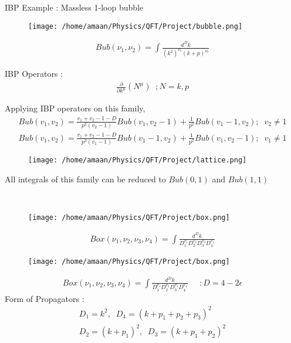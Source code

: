 \documentclass[11pt]{beamer}
\begin{document}
\begin{frame}{IBP Example : Massless 1-loop bubble}
		\begin{figure}
		\centering
		\texttt{[image: /home/amaan/Physics/QFT/Project/bubble.png]}
	\end{figure}
\begin{align*}
	Bub(\nu_1,\nu_2)=\int \frac{d^Dk}{(k^2)^{\nu_1}(k+p)^{\nu_2}}
\end{align*}
\end{frame}
\begin{frame}
	IBP Operators : 
	\begin{align*}
		\frac{\partial}{\partial k^{\mu}}(N^{\mu}) \;\; ;N=k,p
	\end{align*}
\end{frame}
\begin{frame}
	Applying IBP operators on this family,
	\begin{align*}
		Bub(v_1,v_2)=\frac{v_1+v_2-1-D}{p^2(v_2-1)}Bub(v_1,v_2-1)+\frac{1}{p^2}Bub(v_1-1,v_2) ;\;\;v_2\neq 1\\
		Bub(v_1,v_2)=\frac{v_1+v_2-1-D}{p^2(v_1-1)}Bub(v_1-1,v_2)+\frac{1}{p^2}Bub(v_1,v_2-1) ;\;\;v_1\neq 1
	\end{align*}
\end{frame}
\begin{frame}
		\begin{figure}
		\centering
		\texttt{[image: /home/amaan/Physics/QFT/Project/lattice.png]}
		\label{fig:enter-label}
	\end{figure}
All integrals of this family can be reduced to $Bub(0,1)$ and $Bub(1,1)$
\end{frame}
{
	\begin{frame}
		\begin{center}
			\textcolor{white}{1-loop Massless Box}
		\end{center}
	\end{frame}
}
\begin{frame}
	\begin{figure}
		\centering
		\texttt{[image: /home/amaan/Physics/QFT/Project/box.png]}
		\label{fig:enter-label}
	\end{figure}
\begin{align*}
	Box(\nu_1,\nu_2,\nu_3,\nu_4)=\int \frac{d^Dk}{D_1^{\nu_1}D_2^{\nu_2}D_3^{\nu_3}D_4^{\nu_4}}
\end{align*}
\end{frame}
\begin{frame}
	\begin{figure}
		\centering
		\texttt{[image: /home/amaan/Physics/QFT/Project/box.png]}
		\label{fig:enter-label}
	\end{figure}
	\begin{align*}
		Box(\nu_1,\nu_2,\nu_3,\nu_4)=\int \frac{d^Dk}{D_1^{\nu_1}D_2^{\nu_2}D_3^{\nu_3}D_4^{\nu_4}}  \;\;\;\;\; : D=4-2\epsilon
	\end{align*}
Form of Propagators : 
\begin{align*}
	D_1=k^2,\;\;D_4=(k+p_1+p_2+p_3)^2\\
	D_2=(k+p_1)^2,\;\;D_3=(k+p_1+p_2)^2
\end{align*}
\end{frame}
\end{document}
